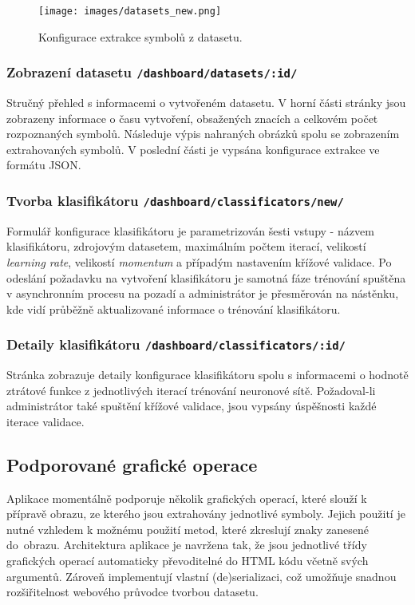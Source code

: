 \documentclass[
  field=ainfp,
  master=true,
  biblatex,
  sourcecodes=false,
  theorems=false,
  glossaries,
  index
]{kidiplom}
\begin{document}
\begin{figure}[h]
  \centering
  \texttt{[image: images/datasets\_new.png]}
  \caption{Konfigurace extrakce symbolů z datasetu.}
  \label{fig:dataset_new}
\end{figure}

\subsubsection*{Zobrazení datasetu \texttt{/dashboard/datasets/:id/}}
Stručný přehled s informacemi o vytvořeném datasetu. V horní části stránky jsou zobrazeny informace o času vytvoření, obsažených znacích a celkovém počet rozpoznaných symbolů. Následuje výpis nahraných obrázků spolu se zobrazením extrahovaných symbolů. V poslední části je vypsána konfigurace extrakce ve formátu JSON. 

\subsubsection*{Tvorba klasifikátoru \texttt{/dashboard/classificators/new/}}
Formulář konfigurace klasifikátoru je parametrizován šesti vstupy - názvem klasifikátoru, zdrojovým datasetem, maximálním počtem iterací, velikostí \textit{learning rate}, velikostí \textit{momentum} a případým nastavením křížové validace. Po odeslání požadavku na vytvoření klasifikátoru je samotná fáze trénování spuštěna v asynchronním procesu na pozadí a administrátor je přesměrován na nástěnku, kde vidí průběžně aktualizované informace o trénování klasifikátoru.

\subsubsection*{Detaily klasifikátoru \texttt{/dashboard/classificators/:id/}}
Stránka zobrazuje detaily konfigurace klasifikátoru spolu s informacemi o hodnotě ztrátové funkce z jednotlivých iterací trénování neuronové sítě. Požadoval-li administrátor také spuštění křížové validace, jsou vypsány úspěšnosti každé ite\-race validace.


\subsection{Podporované grafické operace}
Aplikace momentálně podporuje několik grafických operací, které slouží k pří\-pravě obrazu, ze kterého jsou extrahovány jednotlivé symboly. Jejich použití je nutné vzhledem k možnému použití metod, které zkreslují znaky zanesené do~obrazu. Architektura aplikace je navržena tak, že jsou jednotlivé třídy grafických operací automaticky převoditelné do HTML kódu včetně svých argumentů. Zároveň implementují vlastní (de)se\-riali\-zaci, což umožňuje snadnou rozšiřitelnost webového průvodce tvorbou data\-setu.
\end{document}
